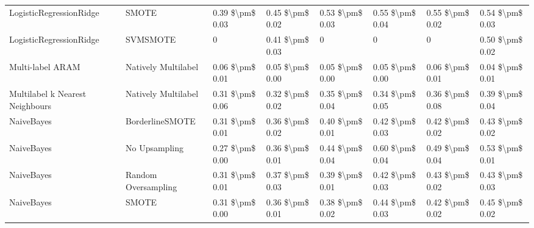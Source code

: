 \begin{tabular}{llllllll}
        LogisticRegressionRidge &                         SMOTE & 0.39 \$\textbackslash pm\$ 0.03 &           0.45 \$\textbackslash pm\$ 0.02 &       0.53 \$\textbackslash pm\$ 0.03 &        0.55 \$\textbackslash pm\$ 0.04 &                         0.55 \$\textbackslash pm\$ 0.02 &     0.54 \$\textbackslash pm\$ 0.03 \\
        LogisticRegressionRidge &                      SVMSMOTE &               0 &           0.41 \$\textbackslash pm\$ 0.03 &                     0 &                      0 &                                       0 &     0.50 \$\textbackslash pm\$ 0.02 \\
               Multi-label ARAM &           Natively Multilabel & 0.06 \$\textbackslash pm\$ 0.01 &           0.05 \$\textbackslash pm\$ 0.00 &       0.05 \$\textbackslash pm\$ 0.00 &        0.05 \$\textbackslash pm\$ 0.00 &                         0.06 \$\textbackslash pm\$ 0.01 &     0.04 \$\textbackslash pm\$ 0.01 \\
Multilabel k Nearest Neighbours &           Natively Multilabel & 0.31 \$\textbackslash pm\$ 0.06 &           0.32 \$\textbackslash pm\$ 0.02 &       0.35 \$\textbackslash pm\$ 0.04 &        0.34 \$\textbackslash pm\$ 0.05 &                         0.36 \$\textbackslash pm\$ 0.08 &     0.39 \$\textbackslash pm\$ 0.04 \\
                     NaiveBayes &               BorderlineSMOTE & 0.31 \$\textbackslash pm\$ 0.01 &           0.36 \$\textbackslash pm\$ 0.02 &       0.40 \$\textbackslash pm\$ 0.01 &        0.42 \$\textbackslash pm\$ 0.03 &                         0.42 \$\textbackslash pm\$ 0.02 &     0.43 \$\textbackslash pm\$ 0.02 \\
                     NaiveBayes &                 No Upsampling & 0.27 \$\textbackslash pm\$ 0.00 &           0.36 \$\textbackslash pm\$ 0.01 &       0.44 \$\textbackslash pm\$ 0.04 &        0.60 \$\textbackslash pm\$ 0.04 &                         0.49 \$\textbackslash pm\$ 0.04 &     0.53 \$\textbackslash pm\$ 0.01 \\
                     NaiveBayes &           Random Oversampling & 0.31 \$\textbackslash pm\$ 0.01 &           0.37 \$\textbackslash pm\$ 0.03 &       0.39 \$\textbackslash pm\$ 0.01 &        0.42 \$\textbackslash pm\$ 0.03 &                         0.43 \$\textbackslash pm\$ 0.02 &     0.43 \$\textbackslash pm\$ 0.03 \\
                     NaiveBayes &                         SMOTE & 0.31 \$\textbackslash pm\$ 0.00 &           0.36 \$\textbackslash pm\$ 0.01 &       0.38 \$\textbackslash pm\$ 0.02 &        0.44 \$\textbackslash pm\$ 0.03 &                         0.42 \$\textbackslash pm\$ 0.02 &     0.45 \$\textbackslash pm\$ 0.02 \\

\end{tabular}
